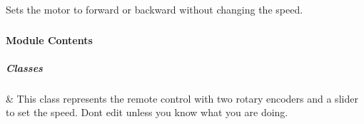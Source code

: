 \documentclass[letterpaper,10pt,english]{sphinxmanual}
\begin{document}
\begin{fulllineitems}

\begin{fulllineitems}
\label{\detokenize{autoapi/robotlibrary/motor/index:robotlibrary.motor.Motor.set_forward}}
\pysigstartsignatures
{}
\pysigstopsignatures
\sphinxAtStartPar
Sets the motor to forward or backward without changing the speed.

\end{fulllineitems}


\end{fulllineitems}


\sphinxstepscope


\subsubsection{}
\label{\detokenize{autoapi/robotlibrary/rc/index:module-robotlibrary.rc}}\label{\detokenize{autoapi/robotlibrary/rc/index:robotlibrary-rc}}\label{\detokenize{autoapi/robotlibrary/rc/index::doc}}

\paragraph{Module Contents}
\label{\detokenize{autoapi/robotlibrary/rc/index:module-contents}}

\subparagraph{Classes}
\label{\detokenize{autoapi/robotlibrary/rc/index:classes}}

\begin{savenotes}\sphinxattablestart
\sphinxthistablewithglobalstyle
\sphinxthistablewithnovlinesstyle
\centering
\begin{tabulary}{\linewidth}[t]{}
\sphinxtoprule
\sphinxtableatstartofbodyhook
\sphinxAtStartPar
{\hyperref[\detokenize{autoapi/robotlibrary/rc/index:robotlibrary.rc.RC}]{}}
&
\sphinxAtStartPar
This class represents the remote control with two rotary encoders and a slider to set the speed. Don\textquotesingle{}t edit unless you know what you are doing.
\\
\sphinxbottomrule
\end{tabulary}
\sphinxtableafterendhook\par
\sphinxattableend\end{savenotes}
\end{document}
